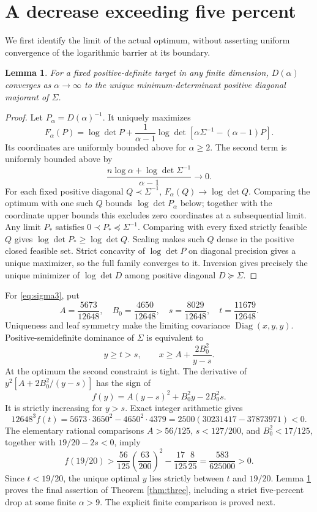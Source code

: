 \documentclass[11pt]{article}
\newtheorem{lemma}[theorem]{Lemma}
\theoremstyle{remark}\newtheorem{remark}[theorem]{Remark}
\newcommand{\Diag}{\operatorname{Diag}}
\begin{document}
\section{A decrease exceeding five percent}
We first identify the limit of the actual optimum, without asserting
uniform convergence of the logarithmic barrier at its boundary.

\begin{lemma}\label{lem:limit}
For a fixed positive-definite target in any finite dimension,
$D(\alpha)$ converges as $\alpha\to\infty$ to the unique
minimum-determinant positive diagonal majorant of $\Sigma$.
\end{lemma}
\begin{proof}
Let $P_\alpha=D(\alpha)^{-1}$. It uniquely maximizes
\[
 F_\alpha(P)=\log\det P+
 \frac1{\alpha-1}\log\det[\alpha\Sigma^{-1}-(\alpha-1)P].
\]
Its coordinates are uniformly bounded above for $\alpha\ge2$.
The second term is uniformly bounded above by
\[
 \frac{n\log\alpha+\log\det\Sigma^{-1}}{\alpha-1}\longrightarrow0.
\]
For each fixed positive diagonal $Q\prec\Sigma^{-1}$,
$F_\alpha(Q)\to\log\det Q$. Comparing the optimum with one such $Q$
bounds $\log\det P_\alpha$ below; together with the coordinate upper
bounds this excludes zero coordinates at a subsequential limit.
Any limit $P_*$ satisfies $0\prec P_*\preceq\Sigma^{-1}$.
Comparing with every fixed strictly feasible $Q$ gives
$\log\det P_*\ge\log\det Q$. Scaling makes such $Q$ dense in the
positive closed feasible set. Strict concavity of $\log\det P$ on
diagonal precision gives a unique maximizer, so the full family
converges to it. Inversion gives precisely the unique minimizer of
$\log\det D$ among positive diagonal $D\succeq\Sigma$.
\end{proof}

For \eqref{eq:sigma3}, put
\[
 A=\frac{5673}{12648},\quad B_0=\frac{4650}{12648},\quad
 s=\frac{8029}{12648},\quad t=\frac{11679}{12648}.
\]
Uniqueness and leaf symmetry make the limiting covariance
$\Diag(x,y,y)$. Positive-semidefinite dominance of $\Sigma$ is
equivalent to
\[
 y\ge t>s,\qquad x\ge A+\frac{2B_0^2}{y-s}.
\]
At the optimum the second constraint is tight. The derivative of
$y^2[A+2B_0^2/(y-s)]$ has the sign of
\[
 f(y)=A(y-s)^2+B_0^2y-2B_0^2s.
\]
It is strictly increasing for $y>s$. Exact integer arithmetic gives
\[
 12648^3 f(t)
 =5673\cdot3650^2-4650^2\cdot4379
 =2500(30231417-37873971)<0.
\]
The elementary rational comparisons
$A>56/125$, $s<127/200$, and $B_0^2<17/125$, together with
$19/20-2s<0$, imply
\[
 f(19/20)>
 \frac{56}{125}\left(\frac{63}{200}\right)^2
 -\frac{17}{125}\frac8{25}
 =\frac{583}{625000}>0.
\]
Since $t<19/20$, the unique optimal $y$ lies strictly between
$t$ and $19/20$. Lemma \ref{lem:limit} proves the final assertion
of Theorem \ref{thm:three}, including a strict five-percent drop at
some finite $\alpha>9$. The explicit finite comparison is proved next.
\end{document}
